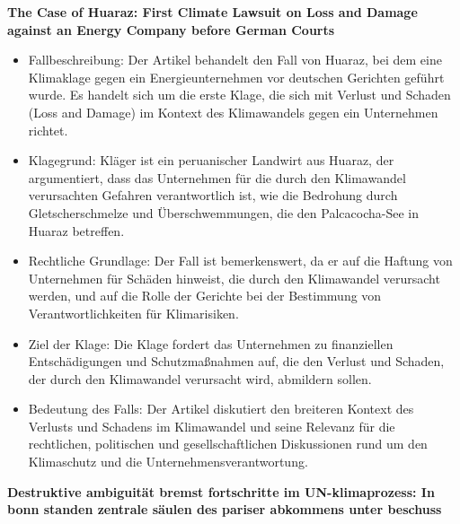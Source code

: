 \documentclass[a4paper, 12pt]{article} %
\begin{document}
 \textbf{\cite{Frank2019} The Case of Huaraz: {{First}} Climate Lawsuit on Loss and Damage against an Energy Company before German Courts}

 \begin{itemize}
   \item Fallbeschreibung: Der Artikel behandelt den Fall von Huaraz, bei dem eine Klimaklage gegen ein Energieunternehmen vor deutschen Gerichten geführt wurde. Es handelt sich um die erste Klage, die sich mit Verlust und Schaden (Loss and Damage) im Kontext des Klimawandels gegen ein Unternehmen richtet.
   \item Klagegrund: Kläger ist ein peruanischer Landwirt aus Huaraz, der argumentiert, dass das Unternehmen für die durch den Klimawandel verursachten Gefahren verantwortlich ist, wie die Bedrohung durch Gletscherschmelze und Überschwemmungen, die den Palcacocha-See in Huaraz betreffen.
   \item Rechtliche Grundlage: Der Fall ist bemerkenswert, da er auf die Haftung von Unternehmen für Schäden hinweist, die durch den Klimawandel verursacht werden, und auf die Rolle der Gerichte bei der Bestimmung von Verantwortlichkeiten für Klimarisiken.
   \item Ziel der Klage: Die Klage fordert das Unternehmen zu finanziellen Entschädigungen und Schutzmaßnahmen auf, die den Verlust und Schaden, der durch den Klimawandel verursacht wird, abmildern sollen.
   \item Bedeutung des Falls: Der Artikel diskutiert den breiteren Kontext des Verlusts und Schadens im Klimawandel und seine Relevanz für die rechtlichen, politischen und gesellschaftlichen Diskussionen rund um den Klimaschutz und die Unternehmensverantwortung.
 \end{itemize}

 \textbf{\cite{Hansen2023Destruktive} Destruktive ambiguität bremst fortschritte im UN-klimaprozess: In bonn standen zentrale säulen des pariser abkommens unter beschuss}
\end{document}
